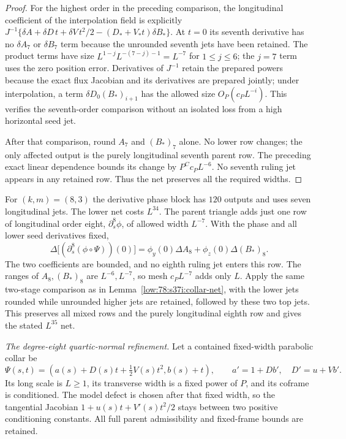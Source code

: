 \documentclass[11pt]{amsart}
\theoremstyle{definition}
\theoremstyle{remark}
\numberwithin{equation}{section}
\begin{document}
\begin{proof}
For the highest order in the preceding comparison, the longitudinal coefficient of the interpolation field is explicitly $J^{-1}\{\delta A+\delta D\,t+\delta V\,t^2/2-(D_*+V_*t)\delta B_*\}$. At $t=0$ its seventh derivative has no $\delta A_7$ or $\delta B_7$ term because the unrounded seventh jets have been retained. The product terms have size $L^{1-j}L^{-(7-j)-1}=L^{-7}$ for $1\le j\le6$; the $j=7$ term uses the zero position error. Derivatives of $J^{-1}$ retain the prepared powers because the exact flux Jacobian and its derivatives are prepared jointly; under interpolation, a term $\delta D_0(B_*)_{i+1}$ has the allowed size $O_P(c_PL^{-i})$. This verifies the seventh-order comparison without an isolated loss from a high horizontal seed jet.

After that comparison, round $A_7$ and $(B_*)_7$ alone. No lower row changes; the only affected output is the purely longitudinal seventh parent row. The preceding exact linear dependence bounds its change by $P^Cc_PL^{-6}$. No seventh ruling jet appears in any retained row. Thus the net preserves all the required widths.
\end{proof}

For $(k,m)=(8,3)$ the derivative phase block has $120$ outputs and uses seven longitudinal jets. The lower net costs $L^{34}$. The parent triangle adds just one row of longitudinal order eight, $\partial_s^8\phi$, of allowed width $L^{-7}$. With the phase and all lower seed derivatives fixed,
\[
\Delta\bigl[(\partial_s^8(\phi\circ\Psi))(0)\bigr]=\phi_y(0)\Delta A_8+\phi_z(0)\Delta(B_*)_8.
\]
The two coefficients are bounded, and no eighth ruling jet enters this row. The ranges of $A_8,(B_*)_8$ are $L^{-6},L^{-7}$, so mesh $c_PL^{-7}$ adds only $L$. Apply the same two-stage comparison as in Lemma~\ref{low:78:s37i:collar-net}, with the lower jets rounded while unrounded higher jets are retained, followed by these two top jets. This preserves all mixed rows and the purely longitudinal eighth row and gives the stated $L^{35}$ net.

\emph{The degree-eight quartic-normal refinement.} Let a contained fixed-width parabolic collar be
\[
\Psi(s,t)=\left(a(s)+D(s)t+\tfrac12V(s)t^2,b(s)+t\right),\qquad a'=1+Db',\quad D'=u+Vb'.
\]
Its long scale is $L\ge1$, its transverse width is a fixed power of $P$, and its coframe is conditioned. The model defect is chosen after that fixed width, so the tangential Jacobian $1+u(s)t+V'(s)t^2/2$ stays between two positive conditioning constants. All full parent admissibility and fixed-frame bounds are retained.
\end{document}
